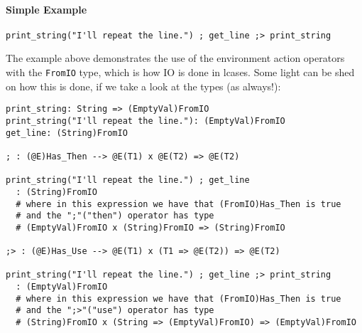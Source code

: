 \documentclass{article}
\begin{document}
\paragraph{Simple Example}
\begin{verbatim}
print_string("I'll repeat the line.") ; get_line ;> print_string
\end{verbatim}
The example above demonstrates the use of the environment action operators with
the \texttt{FromIO} type, which is how IO is done in lcases. Some light can
be shed on how this is done, if we take a look at the types (as always!):
\begin{verbatim}
print_string: String => (EmptyVal)FromIO
print_string("I'll repeat the line."): (EmptyVal)FromIO
get_line: (String)FromIO

; : (@E)Has_Then --> @E(T1) x @E(T2) => @E(T2) 

print_string("I'll repeat the line.") ; get_line
  : (String)FromIO
  # where in this expression we have that (FromIO)Has_Then is true
  # and the ";"("then") operator has type
  # (EmptyVal)FromIO x (String)FromIO => (String)FromIO 

;> : (@E)Has_Use --> @E(T1) x (T1 => @E(T2)) => @E(T2) 

print_string("I'll repeat the line.") ; get_line ;> print_string
  : (EmptyVal)FromIO
  # where in this expression we have that (FromIO)Has_Then is true
  # and the ";>"("use") operator has type
  # (String)FromIO x (String => (EmptyVal)FromIO) => (EmptyVal)FromIO 
\end{verbatim}
\end{document}

